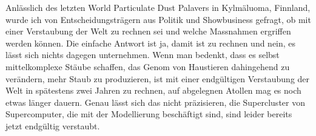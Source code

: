 Anlässlich des letzten World Particulate Dust Palavers in Kylmäluoma, Finnland, wurde ich von Entscheidungsträgern aus Politik und Showbusiness gefragt, ob mit einer Verstaubung der Welt zu rechnen sei und welche Massnahmen ergriffen werden können. Die einfache Antwort ist ja, damit ist zu rechnen und nein, es lässt sich nichts dagegen unternehmen. Wenn man bedenkt, dass es selbst mittelkomplexe Stäube schaffen, das Genom von Haustieren dahingehend zu verändern, mehr Staub zu produzieren, ist mit einer endgültigen Verstaubung der Welt in spätestens zwei Jahren zu rechnen, auf abgelegnen Atollen mag es noch etwas länger dauern. Genau lässt sich das nicht präzisieren, die Supercluster von Supercomputer, die mit der Modellierung beschäftigt sind, sind leider bereits jetzt endgültig verstaubt.

 \vfill
